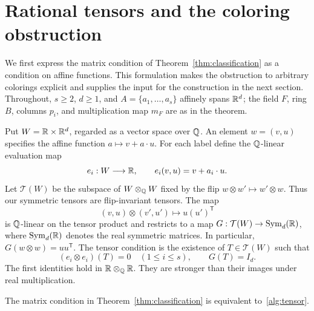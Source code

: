\section{Rational tensors and the coloring obstruction}\label{sec:tensors}

We first express the matrix condition of Theorem~\ref{thm:classification}
as a condition on affine functions.  This formulation makes the obstruction
to arbitrary colorings explicit and supplies the input for the construction
in the next section.  Throughout, $s\geq2$, $d\geq1$, and
$A=\{a_1,\ldots,a_s\}$ affinely spans $\mathbb R^d$; the field $F$, ring $B$,
columns $p_i$, and multiplication map $m_F$ are as in the theorem.

Put $W=\mathbb R\times\mathbb R^d$, regarded as a vector space over $\mathbb Q$.
An element $w=(v,u)$ specifies the affine function $a\mapsto v+a\cdot u$.
For each label define the $\mathbb Q$-linear evaluation map
\[
 e_i:W\longrightarrow\mathbb R,\qquad e_i(v,u)=v+a_i\cdot u.
\]
Let $\mathcal T(W)$ be the subspace of $W\otimes_{\mathbb Q}W$ fixed by the
flip $w\otimes w'\mapsto w'\otimes w$.  Thus our symmetric tensors are
flip-invariant tensors.  The map
\[
 (v,u)\otimes(v',u')\longmapsto u(u')^{\mathsf T}
\]
is $\mathbb Q$-linear on the tensor product and restricts to a map
$G:\mathcal T(W)\to\operatorname{Sym}_d(\mathbb R)$, where $\operatorname{Sym}_d(\mathbb R)$ denotes the real
symmetric matrices.  In particular, $G(w\otimes w)=uu^{\mathsf T}$.
The tensor condition is the existence of $T\in\mathcal T(W)$ such that
\begin{equation}\label{alg:tensor}
 (e_i\otimes e_i)(T)=0\quad(1\leq i\leq s),
 \qquad G(T)=I_d.
\end{equation}
The first identities hold in $\mathbb R\otimes_{\mathbb Q}\mathbb R$.
They are stronger than their images under real multiplication.

\begin{proposition}\label{alg:equivalence}
The matrix condition in Theorem~\ref{thm:classification} is equivalent
to~\eqref{alg:tensor}.
\end{proposition}

